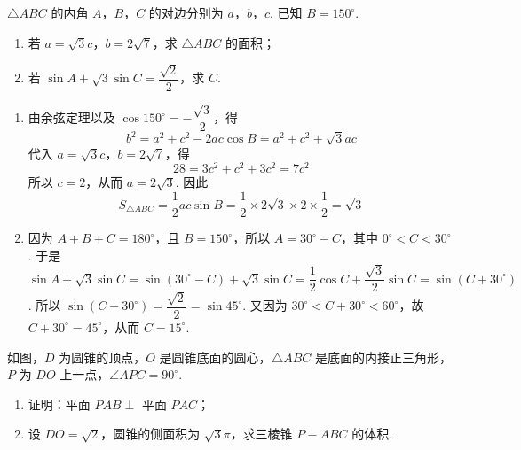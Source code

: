 \begin{problem}
\(\triangle ABC\) 的内角 \(A\)，\(B\)，\(C\) 的对边分别为 \(a\)，\(b\)，\(c\). 已知 \(B=150^{\circ}\).

\begin{enumerate}
\item 若 \(a=\sqrt{3}c\)，\(b=2\sqrt{7}\)，求 \(\triangle ABC\) 的面积；

\item 若 \(\sin A+\sqrt{3}\sin C=\dfrac{\sqrt{2}}{2}\)，求 \(C\).
\end{enumerate}
\end{problem}

\begin{solution}
\begin{enumerate}
\item 由余弦定理以及 \(\cos150^{\circ}=-\dfrac{\sqrt{3}}{2}\)，得
\[
b^2=a^2+c^2-2ac\cos B=a^2+c^2+\sqrt{3}ac
\]
代入 \(a=\sqrt{3}c\)，\(b=2\sqrt{7}\)，得
\[
28=3c^2+c^2+3c^2=7c^2
\]
所以 \(c=2\)，从而 \(a=2\sqrt{3}\).
因此
\[
S_{\triangle ABC}=\dfrac12ac\sin B
=\dfrac12\times2\sqrt{3}\times2\times\dfrac12=\sqrt{3}
\]

\item 因为 \(A+B+C=180^{\circ}\)，且 \(B=150^{\circ}\)，所以
 \(A=30^{\circ}-C\)，其中 \(0^{\circ}<C<30^{\circ}\). 于是
\(\sin A+\sqrt{3}\sin C=\sin(30^{\circ}-C)+\sqrt{3}\sin C=\dfrac12\cos C+\dfrac{\sqrt{3}}2\sin C=\sin(C+30^{\circ})\).
所以 \(\sin(C+30^{\circ})=\dfrac{\sqrt{2}}2=\sin45^{\circ}\).
又因为 \(30^{\circ}<C+30^{\circ}<60^{\circ}\)，故 \(C+30^{\circ}=45^{\circ}\)，从而 \(C=15^{\circ}\).
\end{enumerate}
\end{solution}

\begin{problem}
如图，\(D\) 为圆锥的顶点，\(O\) 是圆锥底面的圆心，\(\triangle ABC\) 是底面的内接正三角形，\(P\) 为 \(DO\) 上一点，\(\angle APC=90^{\circ}\).

\begin{enumerate}
\item 证明：平面 \(PAB\perp\) 平面 \(PAC\)；

\item 设 \(DO=\sqrt{2}\)，圆锥的侧面积为 \(\sqrt{3}\pi\)，求三棱锥 \(P-ABC\) 的体积.
\end{enumerate}

\end{problem}

